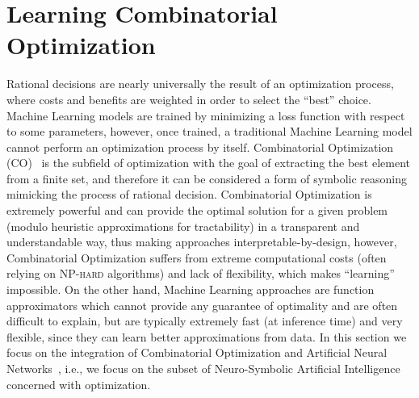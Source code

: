 \section{Learning Combinatorial Optimization} Rational decisions are nearly universally the result of an optimization process, where costs and benefits are weighted in order to select the ``best'' choice. Machine Learning models are trained by minimizing a loss function with respect to some parameters, however, once trained, a traditional Machine Learning model cannot perform an optimization process by itself.
%
Combinatorial Optimization (CO)~\cite{schrijver2005history} is the subfield of optimization with the goal of extracting the best element from a finite set, and therefore it can be considered a form of symbolic reasoning mimicking the process of rational decision.
Combinatorial Optimization is extremely powerful and can provide the optimal solution for a given problem (modulo heuristic approximations for tractability) in a transparent and understandable way, thus making approaches interpretable-by-design, however, Combinatorial Optimization suffers from extreme computational costs (often relying on \textsc{NP-hard} algorithms) and lack of flexibility, which makes ``learning'' impossible.
On the other hand, Machine Learning approaches are function approximators which cannot provide any guarantee of optimality and are often difficult to explain, but are typically extremely fast (at inference time) and very flexible, since they can learn better approximations from data.
%
In this section we focus on the integration of Combinatorial Optimization and Artificial Neural Networks~\cite{kotary2021end}, i.e., we focus on the subset of Neuro-Symbolic Artificial Intelligence concerned with optimization.
%

